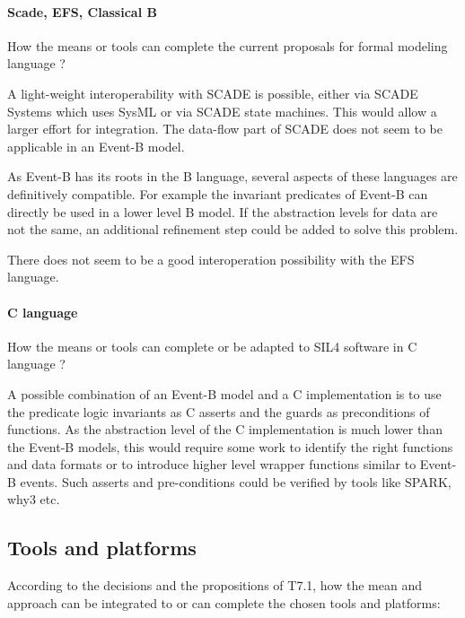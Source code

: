 \paragraph{Scade, EFS, Classical B}
How the means or tools can complete the current proposals for formal modeling language ?

\begin{author_comment}
  A light-weight interoperability with SCADE is possible, either via SCADE
  Systems which uses SysML or via SCADE state machines. This would allow a
  larger effort for integration. The data-flow part of SCADE does not seem to be
  applicable in an Event-B model.

  As Event-B has its roots in the B language, several aspects of these languages
  are definitively compatible. For example the invariant predicates of Event-B
  can directly be used in a lower level B model. If the abstraction levels for
  data are not the same, an additional refinement step could be added to solve
  this problem.

  There does not seem to be a good interoperation possibility with the EFS
  language.
\end{author_comment}


\paragraph{C language}
How the means or tools can complete or be adapted to SIL4 software in C language ?

\begin{author_comment}
  A possible combination of an Event-B model and a C implementation is to use
  the predicate logic invariants as C asserts and the guards as preconditions of
  functions. As the abstraction level of the C implementation is much lower than
  the Event-B models, this would require some work to identify the right
  functions and data formats or to introduce higher level wrapper functions
  similar to Event-B events. Such asserts and pre-conditions could be verified
  by tools like SPARK, why3 etc.
\end{author_comment}

\subsection{Tools and platforms}

According to the decisions and the propositions of T7.1, how the mean and approach can be integrated to or can complete the chosen tools and platforms:

